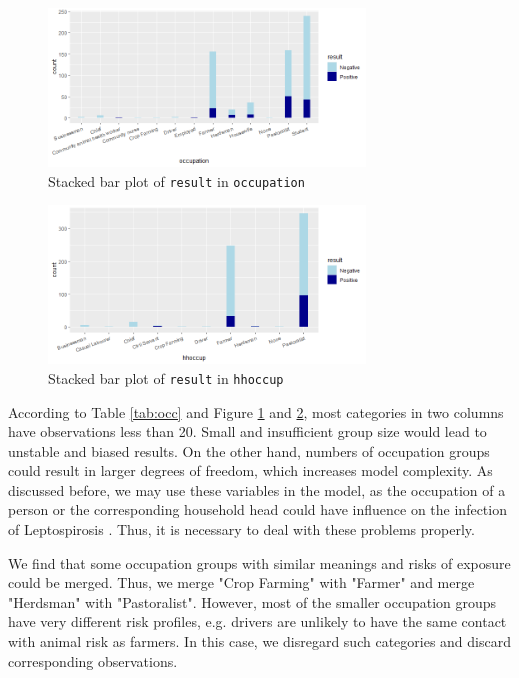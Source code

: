 \documentclass[11pt,twoside]{article}
\numberwithin{Theorem}{section}
\numberwithin{Definition}{section}
\numberwithin{Lemma}{section}
\numberwithin{Algorithm}{section}
\numberwithin{equation}{section}
\begin{document}
\begin{figure}[!h]
	\centering
	\includegraphics[width = 0.75\textwidth]{Images/occupation_3.png}
	\caption{Stacked bar plot of \texttt{result} in \texttt{occupation}}
	\label{fig:occ5}
\end{figure}

\begin{figure}[!h]
	\centering
	\includegraphics[width = 0.75\textwidth]{Images/hhoccup.png}
	\caption{Stacked bar plot of \texttt{result} in \texttt{hhoccup}}
	\label{fig:hhoccup}
\end{figure}

 According to Table \ref{tab:occ} and Figure \ref{fig:occ5} and \ref{fig:hhoccup}, most categories in two columns have observations less than 20. Small and insufficient group size would lead to unstable and  biased results. On the other hand, numbers of occupation groups could result in larger degrees of freedom, which increases model complexity. As discussed before, we may use these variables in the model, as the occupation of a person or the corresponding household head could have influence on the infection of Leptospirosis \cite{cook2016}. Thus, it is necessary to deal with these problems properly.

We find that some occupation groups with similar meanings and risks of exposure could be merged. Thus, we merge "Crop Farming" with "Farmer" and merge "Herdsman" with "Pastoralist". However, most of the smaller occupation groups have very different risk profiles, e.g. drivers are unlikely to have the same contact with animal risk as farmers. In this case, we disregard such categories and discard corresponding observations.
\end{document}

